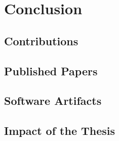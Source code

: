 
\chapter{Conclusion}
\minitoc
\introduction

\section{Contributions}

\section{Published Papers}


\section{Software Artifacts}


\section{Impact of the Thesis}


